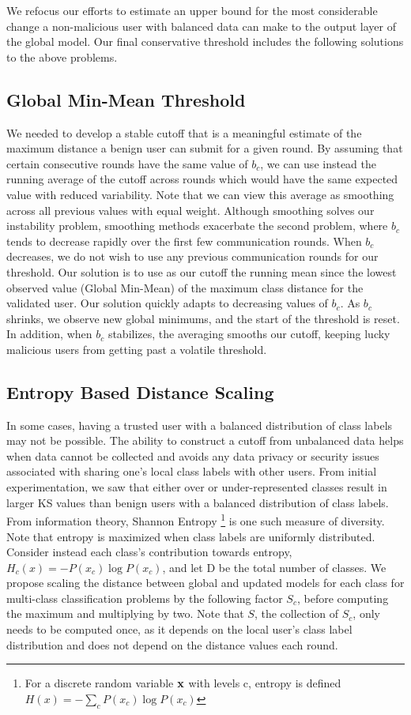 \documentclass{article} %
\begin{document}
We refocus our efforts to estimate an upper bound for the most considerable change a non-malicious user with balanced data can make to the output
layer of the global model. Our final conservative threshold includes the following solutions to the above problems.


%
\subsection{Global Min-Mean Threshold}

We needed to develop a stable cutoff that is a meaningful estimate of the maximum distance a benign user can submit for a given round. By assuming that certain consecutive rounds have the same value of $b_c$, we can use instead the running average of the cutoff across rounds which would have the same expected value with reduced variability. Note that we can view this average as smoothing across all previous values with equal weight. Although smoothing solves our instability problem, smoothing methods exacerbate the second problem, where $b_c$ tends to decrease rapidly over the first few communication rounds. When $b_c$ decreases, we do not wish to use any previous communication rounds for our threshold. Our solution is to use as our cutoff the running mean since the lowest observed value (Global Min-Mean) of the maximum class distance for the validated user. Our solution quickly adapts to decreasing values of $b_c$. As $b_c$ shrinks, we observe new global minimums, and the start of the threshold is reset. In addition, when $b_c$ stabilizes, the averaging smooths our cutoff, keeping lucky malicious users from getting past a volatile threshold.

%
\subsection{Entropy Based Distance Scaling}

In some cases, having a trusted user with a balanced distribution of class labels may not be possible. The ability to construct a cutoff from unbalanced data helps when data cannot be collected and avoids any data privacy or security issues associated with sharing one's local class labels with other users. From initial experimentation, we saw that either over or under-represented classes result in larger KS values than benign users with a balanced distribution of class labels. From information theory, Shannon Entropy \footnote{For a discrete random variable ${\mathbf{x}}$ with levels c, entropy is defined $H(x) = - \sum_c P(x_c) \log P(x_c)$} is one such measure of diversity. Note that entropy is maximized when class labels are uniformly distributed. Consider instead each class's contribution towards entropy, $H_c(x) = - P(x_c) \log P(x_c)$, and let D be the total number of classes. We propose scaling the distance between global and updated models for each class for multi-class classification problems by the following factor $S_c$, before computing the maximum and multiplying by two. Note that $S$, the collection of $S_c$, only needs to be computed once, as it depends on the local user's class label distribution and does not depend on the distance values each round.
\end{document}

